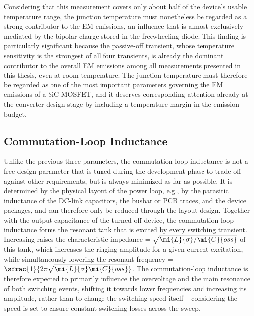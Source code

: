 Considering that this measurement covers only about half of the device's usable temperature range, the junction temperature must nonetheless be regarded as a strong contributor to the EM emissions, an influence that is almost exclusively mediated by the bipolar charge stored in the freewheeling diode.
This finding is particularly significant because the passive-off transient, whose temperature sensitivity is the strongest of all four transients, is already the dominant contributor to the overall EM emissions among all measurements presented in this thesis, even at room temperature.
The junction temperature must therefore be regarded as one of the most important parameters governing the EM emissions of a SiC MOSFET, and it deserves corresponding attention already at the converter design stage by including a temperature margin in the emission budget.

\FloatBarrier

\subsection{Commutation-Loop Inductance}

Unlike the previous three parameters, the commutation-loop inductance  is not a free design parameter that is tuned during the development phase to trade off against other requirements, but is always minimized as far as possible. 
It is determined by the physical layout of the power loop, e.g., by the parasitic inductance of the DC-link capacitors, the busbar or PCB traces, and the device packages, and can therefore only be reduced through the layout design.
Together with the output capacitance  of the turned-off device, the commutation-loop inductance forms the resonant tank that is excited by every switching transient.
Increasing  raises the characteristic impedance  = \(\sqrt{\mi{L}{\sigma}/\mi{C}{oss}}\) of this tank, which increases the ringing amplitude for a given current excitation, while simultaneously lowering the resonant frequency  = $\sfrac{1}{2\pi\sqrt{\mi{L}{\sigma}\mi{C}{oss}}}$.
The commutation-loop inductance is therefore expected to primarily influence the overvoltage and the main resonance of both switching events, shifting it towards lower frequencies and increasing its amplitude, rather than to change the switching speed itself -- considering the speed is set to ensure constant switching losses across the sweep.

